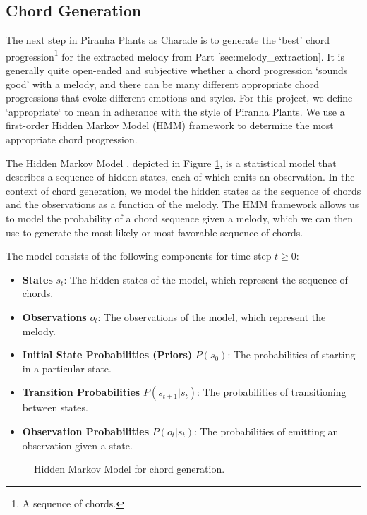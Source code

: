 \subsection{Chord Generation}
\label{sec:chord_generation}

The next step in Piranha Plants as Charade is to generate the `best' chord progression\footnote{A sequence of chords.} for the extracted melody from Part \ref{sec:melody_extraction}. It is generally quite open-ended and subjective whether a chord progression `sounds good' with a melody, and there can be many different appropriate chord progressions that evoke different emotions and styles. For this project, we define `appropriate` to mean in adherance with the style of Piranha Plants. We use a first-order Hidden Markov Model (HMM) framework to determine the most appropriate chord progression.

The Hidden Markov Model \autocite{HMM:2023,SpeechLang:2025}, depicted in Figure \ref{fig:hmm}, is a statistical model that describes a sequence of hidden states, each of which emits an observation. In the context of chord generation, we model the hidden states as the sequence of chords and the observations as a function of the melody. The HMM framework allows us to model the probability of a chord sequence given a melody, which we can then use to generate the most likely or most favorable sequence of chords.

The model consists of the following components for time step $t \geq 0$:
\begin{itemize}
    \item \textbf{States} $s_t$: The hidden states of the model, which represent the sequence of chords.
    \item \textbf{Observations} $o_t$: The observations of the model, which represent the melody.
    \item \textbf{Initial State Probabilities (Priors)} $P(s_0)$: The probabilities of starting in a particular state.
    \item \textbf{Transition Probabilities} $P(s_{t+1} | s_t)$: The probabilities of transitioning between states.
    \item \textbf{Observation Probabilities} $P(o_t | s_t)$: The probabilities of emitting an observation given a state.
\end{itemize}

\begin{figure}
    \resizebox{\linewidth}{!}{}
    \caption{Hidden Markov Model for chord generation.}
    \label{fig:hmm}
\end{figure}

